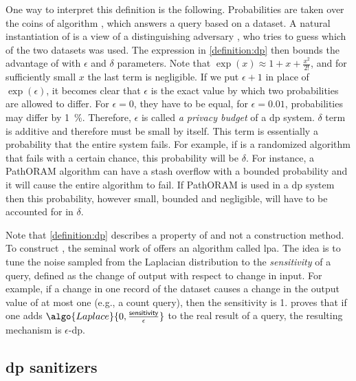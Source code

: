 		One way to interpret this definition is the following.
		Probabilities are taken over the coins of algorithm , which answers a query based on a dataset.
		A natural instantiation of  is a view of a distinguishing adversary \adversary{}, who tries to guess which of the two datasets was used.
		The expression in \cref{definition:dp} then bounds the advantage of \adversary{} with $\epsilon$ and $\delta$ parameters.
		Note that $\exp( x ) \approx 1 + x + \frac{x^2}{2!}$, and for sufficiently small $x$ the last term is negligible.
		If we put $\epsilon + 1$ in place of $\exp( \epsilon )$, it becomes clear that $\epsilon$ is the exact value by which two probabilities are allowed to differ.
		For $\epsilon = 0$, they have to be equal, for $\epsilon = 0.01$, probabilities may differ by \SI{1}{\percent}.
		Therefore, $\epsilon$ is called \emph{a privacy budget} of a \acrshort{dp} system.
		$\delta$ term is additive and therefore must be small by itself.
		This term is essentially a probability that the entire system fails.
		For example, if  is a randomized algorithm that fails with a certain chance, this probability will be $\delta$.
		For instance, a PathORAM \cite{path-oram} algorithm can have a stash overflow with a bounded probability \cite[Theorem 1]{path-oram} and it will cause the entire algorithm to fail.
		If PathORAM is used in a \acrshort{dp} system then this probability, however small, bounded and negligible, will have to be accounted for in $\delta$.

		Note that \cref{definition:dp} describes a property of  and not a construction method.
		To construct , the seminal work of \textcite{differential-privacy-original} offers an algorithm called \acrfull{lpa}.
		The idea is to tune the noise sampled from the Laplacian distribution to the \emph{sensitivity} of a query, defined as the change of output with respect to change in input.
		For example, if a change in one record of the dataset causes a change in the output value of at most one (e.g., a count query), then the sensitivity is 1.
		\cite{differential-privacy-original} proves that if one adds $\algo{Laplace}{0, \frac{\mathsf{sensitivity}}{\epsilon}}$ to the real result of a query, the resulting mechanism is $\epsilon$-\acrshort{dp}.

		\subsection{\texorpdfstring{\acrshort{dp}}{DP} sanitizers}\label{section:background:dp-sanitizers}

